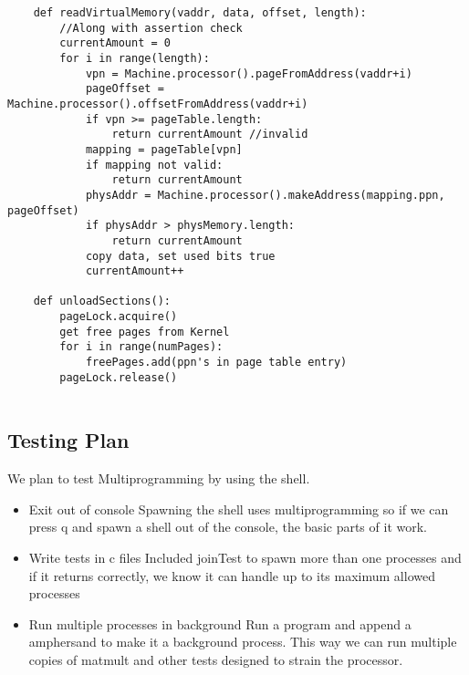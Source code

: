 \begin{verbatim}
    def readVirtualMemory(vaddr, data, offset, length):
        //Along with assertion check
        currentAmount = 0
        for i in range(length):
            vpn = Machine.processor().pageFromAddress(vaddr+i)
            pageOffset = Machine.processor().offsetFromAddress(vaddr+i)
            if vpn >= pageTable.length:
                return currentAmount //invalid
            mapping = pageTable[vpn]
            if mapping not valid:
                return currentAmount
            physAddr = Machine.processor().makeAddress(mapping.ppn, pageOffset)
            if physAddr > physMemory.length:
                return currentAmount
            copy data, set used bits true
            currentAmount++
    
    def unloadSections():
        pageLock.acquire()
        get free pages from Kernel
        for i in range(numPages):
            freePages.add(ppn's in page table entry)
        pageLock.release()
    
\end{verbatim}

\subsection{Testing Plan}
We plan to test Multiprogramming by using the shell.
\begin{itemize}
\item Exit out of console
\subitem Spawning the shell uses multiprogramming so if we can press q and spawn a shell out of the console, the basic parts of it work.
\item Write tests in c files
\subitem Included joinTest to spawn more than one processes and if it returns correctly, we know it can handle up to its maximum allowed processes
\item Run multiple processes in background
\subitem Run a program and append a amphersand to make it a background process. This way we can run multiple copies of matmult and other tests designed to strain the processor.
\end{itemize}
